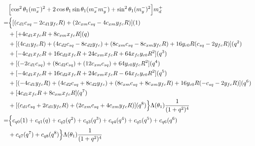 \documentclass[12pt]{article}
\begin{document}
\begin{align}
    &\Bigl[\cos^2\theta_1(m_x^-)^2 + 2\cos\theta_1\sin\theta_1 (m_x^-m_y^-)  + \sin^2\theta_1(m_y^-)^2 \Bigr] m_d^+ \\
    =& \Bigl\{
    [(c_{d1}c_{sq} -2c_{d1}y_{fc}R) + (2c_{xm}c_{sq} -4c_{xm}y_{fc}R )](1) \nonumber\\
    &+ [+4c_{d1}x_{fc}R + 8c_{xm}x_{fc}R](q) \nonumber\\
    &+ [(4c_{d1}y_{fc}R) + (4c_{d2}c_{sq} -8c_{d2}y_{fc}) + (8c_{xm}c_{sq}- 8c_{xm}y_{fc}R) + 16y_{c0}R(c_{sq}-2y_{fc}R)](q^2) \nonumber\\
    &+ [-4c_{d1}x_{fc}R + 16c_{d2}x_{fc}R + 24c_{xm}x_{fc}R + 64x_{fc}y_{c0}R^2](q^3) \nonumber\\
    &+ [(-2c_{d1}c_{sq} ) + (8c_{d2}c_{sq} ) + (12c_{xm}c_{sq}) + 64y_{c0}y_{fc}R^2](q^4) \nonumber\\
    &+ [-4c_{d1}x_{fc}R + 16c_{d2}x_{fc}R + 24c_{xm}x_{fc}R -64x_{fc}y_{c0}R^2](q^5) \nonumber\\
    &+ [(-4c_{d1}y_{fc}R) + (4c_{d2}c_{sq} +8c_{d2}y_{fc}) + (8c_{xm}c_{sq}+ 8c_{xm}y_{fc}R) + 16y_{c0}R(-c_{sq} - 2y_{fc}R)](q^6) \nonumber\\
    &+ [4c_{d1}x_{fc}R + 8c_{xm}x_{fc}R](q^7) \nonumber\\
    &+ [(c_{d1}c_{sq} +2c_{d1}y_{fc}R) + (2c_{xm}c_{sq}+ 4c_{xm}y_{fc}R)](q^8)
    \Bigr\}\Lambda(\theta_1)\frac{1}{(1+q^2)^4} \\
    =& \Bigl\{
    c_{q0}(1) + c_{q1}(q) + c_{q2}(q^2) + c_{q3}(q^3) + c_{q4}(q^4) + c_{q5}(q^5) + c_{q6}(q^6) \nonumber\\
    &+ c_{q7}(q^7) + c_{q8}(q^8)
    \Bigr\}\Lambda(\theta_1)\frac{1}{(1+q^2)^4}
\end{align}
\end{document}
